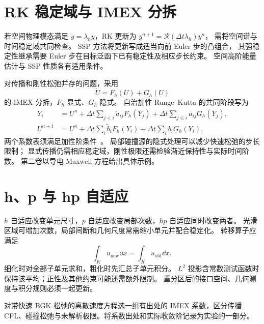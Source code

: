 \section{RK 稳定域与 IMEX 分拆}
若空间物理模态满足 $\dot y=\lambda_hy$，RK 更新为
$y^{n+1}=\mathcal R(\Delta t\lambda_h)y^n$，
需将空间谱与时间稳定域共同检查。
SSP 方法将更新写成适当向前 Euler 步的凸组合，
其强稳定性继承需要 Euler 步在目标泛函下已有稳定性及相应步长约束。
空间高阶能量估计与 SSP 性质各有适用条件。

对传播和刚性松弛并存的问题，采用
\[
\dot U=F_h(U)+G_h(U)
\]
的 IMEX 分拆，$F_h$ 显式、$G_h$ 隐式。
自治加性 Runge--Kutta 的共同阶段写为
\[
\begin{aligned}
Y_i&=U^n+\Delta t\sum_{j<i}\widetilde a_{ij}F_h(Y_j)
+\Delta t\sum_{j\le i}a_{ij}G_h(Y_j),\\
U^{n+1}&=U^n+\Delta t\sum_i\widetilde b_iF_h(Y_i)
+\Delta t\sum_i b_iG_h(Y_i).
\end{aligned}
\]
两个系数表须满足加性阶条件~\cite{ascher1997}。
局部碰撞源的隐式处理可以减少快速松弛的步长限制；
显式传播仍需相应稳定域，刚性极限还需检验渐近保持性与实际时间阶数。
第二卷以导电 Maxwell 方程给出具体示例。

\section{h、p 与 hp 自适应}
$h$ 自适应改变单元尺寸，$p$ 自适应改变局部次数，$hp$ 自适应同时改变两者。
光滑区域可增加次数，局部间断和几何尺度常需缩小单元并配合稳定化。
转移算子应满足
\[
\int_Ku_{\mathrm{new}}\dd x
=\int_Ku_{\mathrm{old}}\dd x,
\]
细化时对全部子单元求和，粗化时先汇总子单元积分。
$L^2$ 投影含常数测试函数时保持该平均；正性及其他约束可能还需额外限制。
重分区后的接口空间、几何测度与积分规则必须一起更新。

{对带快速 BGK 松弛的离散速度方程选一组有出处的 IMEX 系数，区分传播 CFL、碰撞松弛与未解析极限。将系数出处和实际收敛阶记录为实验的一部分。}
